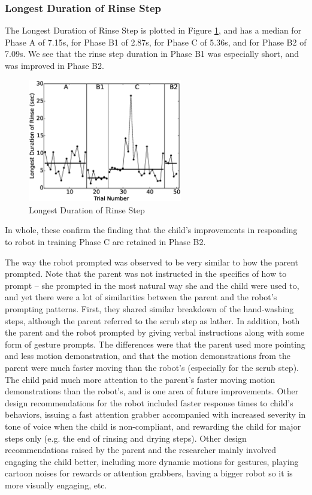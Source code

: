 \subsubsection{Longest Duration of Rinse Step}
The Longest Duration of Rinse Step is plotted in Figure \ref{fig:8LongestDurationofRinsesec}, and has a median for Phase A of 7.15s, for Phase B1 of 2.87s, for Phase C of 5.36s, and for Phase B2 of 7.09s.  We see that the rinse step duration in Phase B1 was especially short, and was improved in Phase B2.
\begin{figure} [H]
	\centering
	\includegraphics[width=0.6\textwidth]{./img/data_analysis/8LongestDurationofRinsesec.eps}
	\caption{Longest Duration of Rinse Step}
	\label{fig:8LongestDurationofRinsesec}
\end{figure}
In whole, these confirm the finding that the child's improvements in responding to robot in training Phase C are retained in Phase B2.

The way the robot prompted was observed to be very similar to how the parent prompted.  Note that the parent was not instructed in the specifics of how to prompt -- she prompted in the most natural way she and the child were used to, and yet there were a lot of similarities between the parent and the robot's prompting patterns.  First, they shared similar breakdown of the hand-washing steps, although the parent referred to the scrub step as lather.  In addition, both the parent and the robot prompted by giving verbal instructions along with some form of gesture prompts.  The differences were that the parent used more pointing and less motion demonstration, and that the motion demonstrations from the parent were much faster moving than the robot's (especially for the scrub step).  The child paid much more attention to the parent's faster moving motion demonstrations than the robot's, and is one area of future improvements.  Other design recommendations for the robot included faster response times to child's behaviors, issuing a fast attention grabber accompanied with increased severity in tone of voice when the child is non-compliant, and rewarding the child for major steps only (e.g. the end of rinsing and drying steps).  Other design recommendations raised by the parent and the researcher mainly involved engaging the child better, including more dynamic motions for gestures, playing cartoon noises for rewards or attention grabbers, having a bigger robot so it is more visually engaging, etc.

